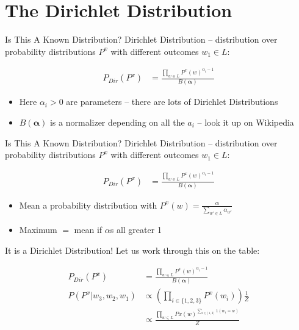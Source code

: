 \documentclass[11pt]{beamer}
\begin{document}
	\section{The Dirichlet Distribution}
	
	\begin{frame}{Is This A Known Distribution?}
		Dirichlet Distribution -- distribution over probability distributions $P^x$ with different outcomes $w_1 \in L$:
		
		\begin{align*}
			P_{Dir}(P^x) & = \frac{\prod_{w \in L} P^{x}(w)^{\alpha_i - 1}}{B(\boldsymbol{\alpha})}
		\end{align*}
		
		\vspace{10pt} \begin{itemize}
			\item Here	$\alpha_i > 0$ are parameters -- there are lots of Dirichlet Distributions
			\item $B(\boldsymbol{\alpha})$ is a normalizer depending on all the $a_i$ -- look it up on Wikipedia
		\end{itemize}
	\end{frame}
	
	\begin{frame}{Is This A Known Distribution?}
		Dirichlet Distribution -- distribution over probability distributions $P^x$ with different outcomes $w_1 \in L$:
		
		\begin{align*}
			P_{Dir}(P^x) & = \frac{\prod_{w \in L} P^{x}(w)^{\alpha_i - 1}}{B(\boldsymbol{\alpha})}
		\end{align*}
		
		\vspace{10pt} \begin{itemize}
			\item Mean a probability distribution with $P^x(w) = \frac{\alpha}{\sum_{w' \in L} \alpha_{w'}}$
			\item Maximum $=$ mean if $\alpha$s all greater 1
		\end{itemize}
	\end{frame}	
	
	\begin{frame}{It is a Dirichlet Distribution!}
		Let us work through this on the table:
	
		\begin{align*}
			P_{Dir}(P^x) & = \frac{\prod_{w \in L} P^{x}(w)^{\alpha_i - 1}}{B(\boldsymbol{\alpha})} \\
			P(P^x \vert w_3,w_2,w_1) & \propto \left(\prod_{i \in \{1,2,3\}} P^{x}(w_i)\right) \frac{1}{Z} \\
			& \propto \frac{\prod_{w \in L} P{x}(w)^{\sum_{i \in [1,3]} 1(w_i = w)}}{Z}
		\end{align*}
	\end{frame}
	
\end{document}
